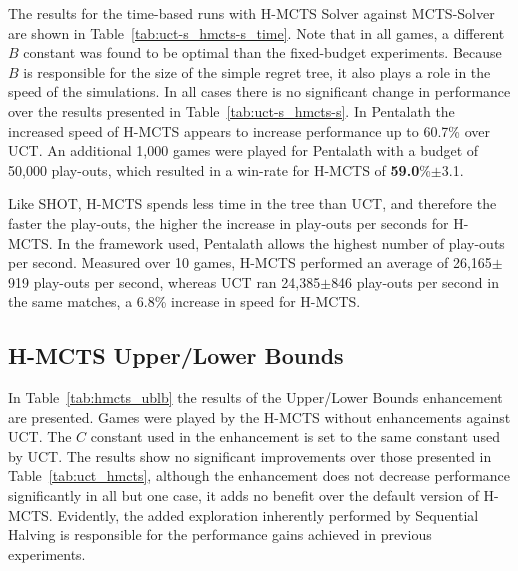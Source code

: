\documentclass{kecsmstr}
\begin{document}
The results for the time-based runs with H-MCTS Solver against MCTS-Solver are shown in Table~\ref{tab:uct-s_hmcts-s_time}. Note that in all games, a different $B$ constant was found to be optimal than the fixed-budget experiments. Because $B$ is responsible for the size of the simple regret tree, it also plays a role in the speed of the simulations. In all cases there is no significant change in performance over the results presented in Table~\ref{tab:uct-s_hmcts-s}. In Pentalath the increased speed of H-MCTS appears to increase performance up to 60.7\% over UCT. An additional 1,000 games were played for Pentalath with a budget of 50,000 play-outs, which resulted in a win-rate for H-MCTS of {\bf{59.0}}\%$\pm$3.1. 

Like SHOT, H-MCTS spends less time in the tree than UCT, and therefore the faster the play-outs, the higher the increase in play-outs per seconds for H-MCTS. In the framework used, Pentalath allows the highest number of play-outs per second. Measured over 10 games, H-MCTS performed an average of 26,165$\pm$919 play-outs per second, whereas UCT ran 24,385$\pm$846 play-outs per second in the same matches, a 6.8\% increase in speed for H-MCTS.

\subsection{H-MCTS Upper/Lower Bounds}
\label{subsec:hmcts_ublb}

In Table~\ref{tab:hmcts_ublb} the results of the Upper/Lower Bounds enhancement are presented. Games were played by the H-MCTS without enhancements against UCT. The $C$ constant used in the enhancement is set to the same constant used by UCT. The results show no significant improvements over those presented in Table~\ref{tab:uct_hmcts}, although the enhancement does not decrease performance significantly in all but one case, it adds no benefit over the default version of H-MCTS. Evidently, the added exploration inherently performed by Sequential Halving is responsible for the performance gains achieved in previous experiments.
\end{document}
